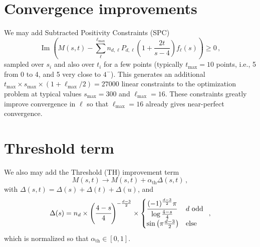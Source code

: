 \section*{Convergence improvements}
We may add Subtracted Positivity Constraints (SPC) 
\begin{equation}
\operatorname{Im}\left(M(s,t)-
\sum_\ell^{\ell_\mathrm{max}} n_{d,\ell}
P_{d,\ell}\left(1+\frac{2t}{s-4}\right)
f_\ell(s)
\right)\geq0\,,
\end{equation}
sampled over $s_i$ and also over $t_i$ for a few points (typically $t_{\mathrm{max}}=10$ points, i.e., 5 from 0 to 4, and 5 very close to $4^-$). This generates an additional $t_{\mathrm{max}}\times s_{\mathrm{max}}\times (1+\ell_{\mathrm{max}}/2) =27000$ linear constraints to the optimization problem at typical values $s_{\mathrm{max}}=300$ and $\ell_{\mathrm{max}}=16$. These constraints greatly improve convergence in $\ell$ so that $\ell_{\mathrm{max}}=16$ already gives near-perfect convergence.




\section*{Threshold term}
We also may add the Threshold (TH) improvement term
\begin{equation}
M(s,t)\rightarrow M(s,t)+\alpha_{\mathrm{th}}\Delta(s,t)\,,
\end{equation}
with
$\Delta(s,t)=\Delta(s)+\Delta(t)+\Delta(u)$, and 
\begin{equation}
\Delta(s)=
n_d\times
\left(\cfrac{4-s}{4}\right)^{-\frac{d-3}{2}}\times
\begin{cases}
\cfrac{(-1)^{\frac{d-3}{2}}\pi}{\log{\frac{4-s}{4}}} & d \text{ odd} \\
\sin\left(\pi\frac{d-3}{2}\right) & \text{else}
\end{cases}\,\,\,,
\end{equation}
which is normalized so that $\alpha_{\mathrm{th}}\in[0,1]$.


